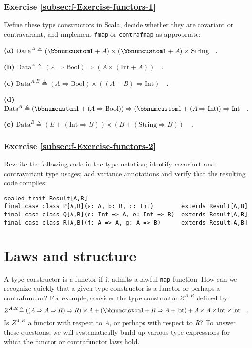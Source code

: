 \subsubsection{Exercise \label{subsec:f-Exercise-functors-1}\ref{subsec:f-Exercise-functors-1}}

Define these type constructors in Scala, decide whether they are covariant
or contravariant, and implement \lstinline!fmap! or \lstinline!contrafmap!
as appropriate:

\textbf{(a)} $\text{Data}^{A}\triangleq\left(\bbnum 1+A\right)\times\left(\bbnum 1+A\right)\times\text{String}\quad.$

\textbf{(b)} $\text{Data}^{A}\triangleq(A\Rightarrow\text{Bool})\Rightarrow\left(A\times\left(\text{Int}+A\right)\right)\quad.$

\textbf{(c)} $\text{Data}^{A,B}\triangleq(A\Rightarrow\text{Bool})\times\left((A+B)\Rightarrow\text{Int}\right)\quad.$

\textbf{(d)} $\text{Data}^{A}\triangleq(\bbnum 1+(A\Rightarrow\text{Bool}))\Rightarrow(\bbnum 1+(A\Rightarrow\text{Int}))\Rightarrow\text{Int}\quad.$

\textbf{(e)} $\text{Data}^{B}\triangleq(B+(\text{Int}\Rightarrow B))\times(B+(\text{String}\Rightarrow B))\quad.$

\subsubsection{Exercise \label{subsec:f-Exercise-functors-2}\ref{subsec:f-Exercise-functors-2}}

Rewrite the following code in the type notation; identify covariant
and contravariant type usages; add variance annotations and verify
that the resulting code compiles:

\begin{lstlisting}
sealed trait Result[A,B]
final case class P[A,B](a: A, b: B, c: Int)        extends Result[A,B]
final case class Q[A,B](d: Int => A, e: Int => B)  extends Result[A,B]
final case class R[A,B](f: A => A, g: A => B)      extends Result[A,B]
\end{lstlisting}


\section{Laws and structure\label{sec:f-Laws-and-structure}}

A type constructor is a functor if it admits a lawful \lstinline!map!
function. How can we recognize quickly that a given type constructor
is a functor or perhaps a contrafunctor? For example, consider the
type constructor $Z^{A,R}$ defined by 
\begin{equation}
Z^{A,R}\triangleq\left(\left(A\Rightarrow A\Rightarrow R\right)\Rightarrow R\right)\times A+\left(\bbnum 1+R\Rightarrow A+\text{Int}\right)+A\times A\times\text{Int}\times\text{Int}\quad.\label{eq:f-example-complicated-z}
\end{equation}
Is $Z^{A,R}$ a functor with respect to $A$, or perhaps with respect
to $R$? To answer these questions, we will systematically build up
various type expressions for which the functor or contrafunctor laws
hold. 

